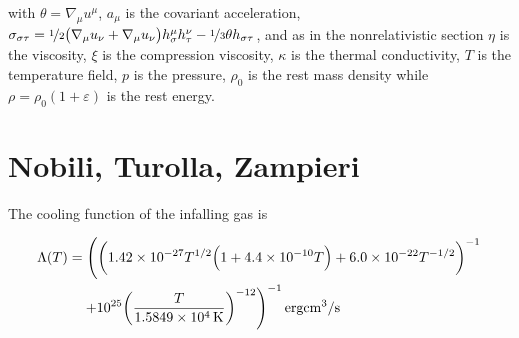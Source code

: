 \documentclass[main.tex]{subfiles}
\begin{document}
with \(\theta = \nabla_\mu u^\mu\), \(a_\mu\) is the covariant acceleration, \(\sigma_{\sigma \tau} = \frac[i]{1}{2} \qty(\nabla_\mu u_\nu + \nabla_\mu u_\nu) h^\mu_\sigma h^\nu _\tau - \frac[i]{1}{3} \theta h_{\sigma \tau}\),
and as in the nonrelativistic section \(\eta\) is the viscosity, \(\xi\) is the compression viscosity,  \(\kappa\) is the thermal conductivity, \(T\) is the temperature field, \(p\) is the pressure, \(\rho_0\) is the rest mass density while \(\rho = \rho_0 (1 + \varepsilon)\) is the rest energy.

\section{Nobili, Turolla, Zampieri}

The cooling function of the infalling gas is

\begin{equation}
    \begin{split}
    \Lambda (T) &= \left(
    \qty(
    \SI{1.42e-27}{}T^{1/2} \qty(
    1 + \SI{4.4e-10}{}T
    ) + \SI{6.0e-22}{}T^{-1/2}
    )^{-1} \right. \\
    & \quad \left. + \SI{e25}{} \qty(\frac{T}{\SI{1.5849e4}{K} })^{-12}
    \right)^{-1} \SI{}{erg cm^3 \per s}
    \end{split}
\end{equation}
\end{document}
